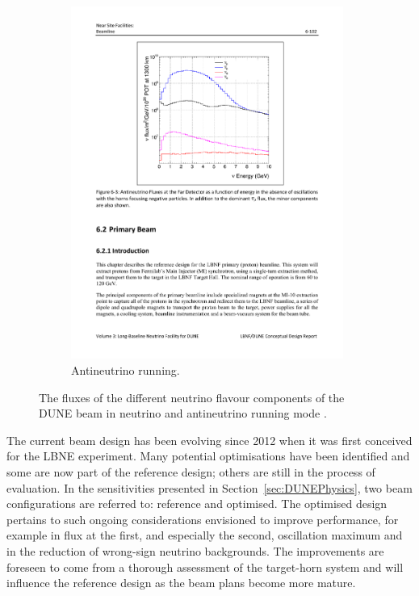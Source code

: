 \begin{figure}
\begin{subfigure}[t]{0.48\linewidth}
    \includegraphics[width=0.98\textwidth]{DUNEBeamFluxesAntiNeutrino.pdf}
    \caption{Antineutrino running.}
    \label{fig:DUNEBeamFluxesAntiNeutrino}
  \end{subfigure}
  \caption[The fluxes of the different neutrino flavour components of the DUNE beam in neutrino and antineutrino running mode.]{The fluxes of the different neutrino flavour components of the DUNE beam in neutrino and antineutrino running mode \cite{DUNECDR3}.}
  \label{fig:DUNEBeamFluxes}
\end{figure}

The current beam design has been evolving since 2012 when it was first conceived for the LBNE experiment.  Many potential optimisations have been identified and some are now part of the reference design; others are still in the process of evaluation.  In the sensitivities presented in Section~\ref{sec:DUNEPhysics}, two beam configurations are referred to: reference and optimised.  The optimised design pertains to such ongoing considerations envisioned to improve performance, for example in flux at the first, and especially the second, oscillation maximum and in the reduction of wrong-sign neutrino backgrounds.  The improvements are foreseen to come from a thorough assessment of the target-horn system and will influence the reference design as the beam plans become more mature.

